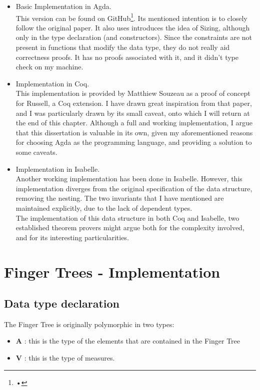 \documentclass[12pt,twoside,notitlepage]{report}
\begin{document}
\begin{itemize}
\item Basic Implementation in Agda. \\
This version can be found on GitHub\footnote{•}. Its mentioned intention is to closely follow the original paper. It also uses introduces the idea of Sizing, although only in the type declaration (and constructors). Since the constraints are not present in functions that modify the data type, they do not really aid correctness proofs. It has no proofs associated with it, and it didn't type check on my machine.
\item Implementation in Coq. \\
This implementation is provided by Matthiew Souzeau\cite{coq} as a proof of concept for Russell, a Coq extension. I have drawn great inspiration from that paper, and I was particularly drawn by its small caveat, onto which I will return at the end of this chapter. Although a full and working implementation, I argue that this dissertation is valuable in its own, given my aforementioned reasons for choosing Agda as the programming language, and providing a solution to some caveats.
\item Implementation in Isabelle. \\
Another working implementation has been done in Isabelle. However, this implementation diverges from the original specification of the data structure, removing the nesting. The two invariants that I have mentioned are maintained explicitly, due to the lack of dependent types.\\ 

The implementation of this data structure in both Coq and Isabelle, two established theorem provers might argue both for the complexity involved, and for its interesting particularities.
\end{itemize}

\section{Finger Trees - Implementation}

\subsection{Data type declaration}

The Finger Tree is originally polymorphic in two types:
\begin{itemize}
\item \textbf{A} : this is the type of the elements that are contained in the Finger Tree 
\item \textbf{V} : this is the type of measures. 
\end{itemize} 
\end{document}
